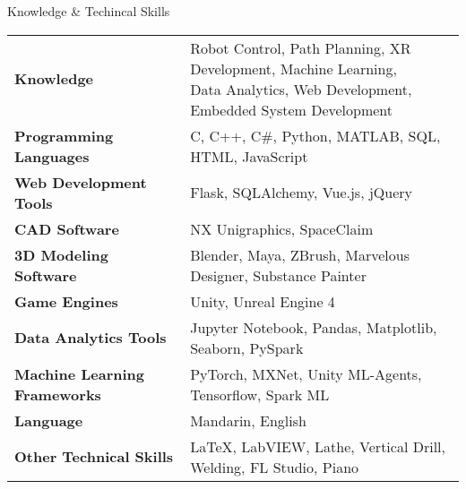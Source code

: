\documentclass{resume} %
\begin{document}
\begin{rSection}{Knowledge \& Techincal Skills}

\begin{tabular}{ @{} >{\bfseries}l @{\hspace{6ex}} l }
Knowledge & \pbox{20cm}{Robot Control, Path Planning, XR Development, Machine Learning, 
                        \\Data Analytics, Web Development, Embedded System Development
                        } \smallskip\\

Programming Languages & C, C++, C\#, Python, MATLAB, SQL, HTML, JavaScript\\
Web Development Tools & Flask, SQLAlchemy, Vue.js, jQuery \\
CAD Software & NX Unigraphics, SpaceClaim  \\
3D Modeling Software & Blender, Maya, ZBrush, Marvelous Designer, Substance Painter\\
Game Engines & Unity, Unreal Engine 4 \\
Data Analytics Tools & Jupyter Notebook, Pandas, Matplotlib, Seaborn, PySpark\\
Machine Learning Frameworks & PyTorch, MXNet, Unity ML-Agents, Tensorflow, Spark ML\\
Language & Mandarin, English \\
Other Technical Skills & LaTeX, LabVIEW, Lathe, Vertical Drill, Welding, FL Studio, Piano
\end{tabular}

\end{rSection}





\end{document}
